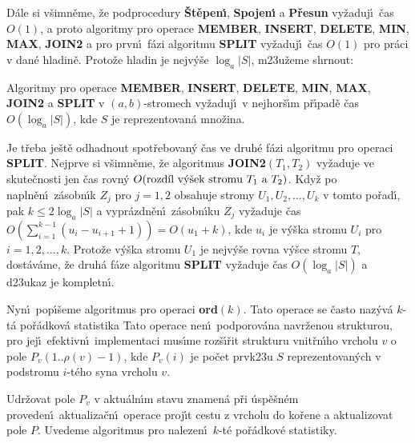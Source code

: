\flushpar D\'ale si v\v simn\v eme, \v ze podprocedury {\bf \v St\v epen\'\i }, {\bf Spojen\'\i} a {\bf P\v re\-sun }
vy\v zaduj\'\i\ \v cas $O(1)$, a proto algoritmy pro operace {\bf MEMBER}, 
{\bf INSERT}, {\bf DELETE}, {\bf MIN}, {\bf MAX}, {\bf JOIN2} a pro prvn\'\i\ f\'azi algoritmu 
{\bf SPLIT} vy\v zaduj\'\i\ \v cas $O(1)$ pro pr\'aci v dan\'e hladin\v e.  Proto\v ze 
hladin je nejv\'y\v se $\log_a|S|$, m\accent23u\v zeme shrnout: 


Algoritmy pro operace {\bf MEMBER}, {\bf INSERT}, 
{\bf DE\-LETE}, {\bf MIN}, {\bf MAX}, {\bf JOIN2} a {\bf SPLIT} v $
(a,b)$-stromech vy\-\v zaduj\'\i\ 
v nejhor\v s\'\i m p\v r\'\i pad\v e \v cas $O(\log_a|S|)$, kde $
S$ je 
re\-pre\-zen\-tovan\'a mno\v zina.  
\endproclaim


\flushpar Je t\v reba je\v st\v e odhadnout spot\v rebovan\'y \v cas ve druh\'e f\'azi 
algoritmu pro operaci {\bf SPLIT}. Nejprve si v\v simn\v eme, \v ze 
algoritmus {\bf JOIN2$(T_1,T_2)$} vy\v zaduje ve skute\v cnosti jen \v cas 
rovn\'y 
$O(\text{\rm rozd\'\i l v\'y\v sek strom\accent23u }T_1\text{\rm \ a }
T_2)$. Kdy\v z po napln\v en\'\i\ 
z\'asobn\'\i k $Z_j$ pro $j=1,2$ obsahuje stromy $U_1,U_2,\dots,U_
k$ v tomto 
po\v rad\'\i , pak $k\le 2\log_a|S|$ a vypr\'azdn\v en\'\i\ z\'asobn\'\i ku $
Z_j$ 
vy\v zaduje 
\v cas $O(\sum_{i=1}^{k-1}(u_i-u_{i+1}+1))=O(u_1+k)$, kde $u_i$ je v\'y\v ska stromu $
U_i$ pro 
$i=1,2,\dots,k$. Proto\v ze v\'y\v ska stromu $U_1$ je nejv\'y\v se rovna v\'y\v sce 
stromu $T$, dost\'av\'ame, \v ze druh\'a f\'aze algoritmu {\bf SPLIT} vy\v zaduje 
\v cas $O(\log_a|S|)$ a d\accent23ukaz je kompletn\'\i . 
\medskip

\flushpar Nyn\'\i\ pop\'\i\v seme algoritmus pro operaci {\bf ord$
(k)$}. Tato 
operace se \v casto naz\'yv\'a $k$-t\'a po\v r\'adko\-v\'a statistika
Tato operace nen\'\i\ podporov\'ana navr\v zenou 
strukturou, pro jej\'\i\ efektivn\'\i\ implementaci mus\'\i me 
roz\v s\'\i\v rit strukturu vnit\v rn\'\i ho vrcholu $v$ o pole\newline 
$P_v(1..\rho (v)-1)$, kde $P_v(i)$ je po\v cet prvk\accent23u $S$ reprezentovan\'ych 
v podstromu $i$-t\'eho syna vrcholu $v$.
\smallskip
 
\flushpar Udr\v zovat pole $P_v$ v aktu\'aln\'\i m stavu znamen\'a p\v ri \'usp\v e\v sn\'em 
pro\-veden\'\i\ aktualiza\v cn\'\i\ operace proj\'\i t cestu z vrcholu do ko\v re\-ne 
a aktualizovat pole $P$. Uvedeme algoritmus pro 
naleze\-n\'\i\ $k$-t\'e po\v r\'adkov\'e statistiky.
\medskip

